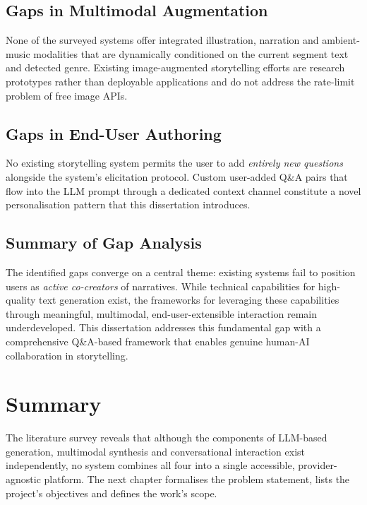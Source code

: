 \subsection{Gaps in Multimodal Augmentation}
None of the surveyed systems offer integrated illustration, narration
and ambient-music modalities that are dynamically conditioned on the
current segment text and detected genre. Existing image-augmented
storytelling efforts \cite{schuhmann2024visualstory,bouhuis2024crossmodal}
are research prototypes rather than deployable applications and do
not address the rate-limit problem of free image APIs.

\subsection{Gaps in End-User Authoring}
No existing storytelling system permits the user to add
\emph{entirely new questions} alongside the system's elicitation
protocol. Custom user-added Q\&A pairs that flow into the LLM prompt
through a dedicated context channel constitute a novel personalisation
pattern that this dissertation introduces.

\subsection{Summary of Gap Analysis}
The identified gaps converge on a central theme: existing systems
fail to position users as \emph{active co-creators} of narratives.
While technical capabilities for high-quality text generation exist,
the frameworks for leveraging these capabilities through meaningful,
multimodal, end-user-extensible interaction remain underdeveloped.
This dissertation addresses this fundamental gap with a comprehensive
Q\&A-based framework that enables genuine human-AI collaboration in
storytelling.

\section{Summary}
The literature survey reveals that although the components of
LLM-based generation, multimodal synthesis and conversational
interaction exist independently, no system combines all four into a
single accessible, provider-agnostic platform. The next chapter
formalises the problem statement, lists the project's objectives and
defines the work's scope.

